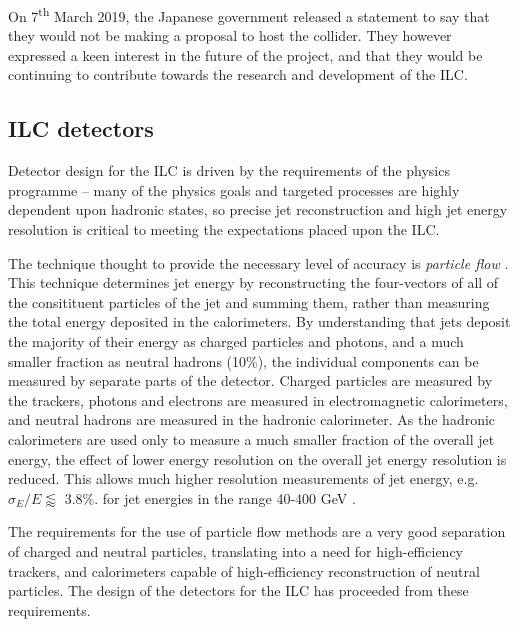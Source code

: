 On 7\textsuperscript{th} March 2019, the Japanese government released a statement to say that they would not be making a proposal to host the collider\cite{japan-ilc-decision}. They however expressed a keen interest in the future of the project, and that they would be continuing to contribute towards the research and development of the \acrshort{ILC}.

\subsection{ILC detectors}
\label{section:ILC-detectors}
Detector design for the \acrshort{ILC} is driven by the requirements of the physics programme -- many of the physics goals and targeted processes are highly dependent upon hadronic states, so precise jet reconstruction and high jet energy resolution is critical to meeting the expectations placed upon the \acrshort{ILC}. 

The technique thought to provide the necessary level of accuracy is \textit{particle flow} \cite{particle-flow-algorithms}. This technique determines jet energy by reconstructing the four-vectors of all of the consitituent particles of the jet and summing them, rather than measuring the total energy deposited in the calorimeters. By understanding that jets deposit the majority of their energy as charged particles and photons, and a much smaller fraction as neutral hadrons (10\%), the individual components can be measured by separate parts of the detector. Charged particles are measured by the trackers, photons and electrons are measured in electromagnetic calorimeters, and neutral hadrons are measured in the hadronic calorimeter. As the hadronic calorimeters are used only to measure a much smaller fraction of the overall jet energy, the effect of lower energy resolution on the overall jet energy resolution is reduced. This allows much higher resolution measurements of jet energy, e.g. $\sigma_E / E \lessapprox$ 3.8\%. for jet energies in the range 40-400 GeV \cite{particle-flow-algorithms}.

The requirements for the use of particle flow methods are a very good separation of charged and neutral particles, translating into a need for high-efficiency trackers, and calorimeters capable of high-efficiency reconstruction of neutral particles. The design of the detectors for the \acrshort{ILC} has proceeded from these requirements.

